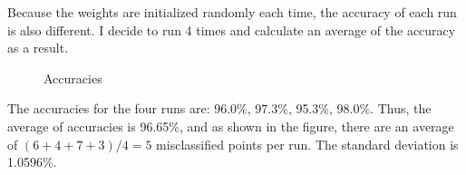 \documentclass{article}
\begin{document}
Because the weights are initialized randomly each time, the accuracy of each run is also different. I decide to run 4 times and calculate an average of the accuracy as a result.
\begin{figure}[htbp]
\centering
{}
\quad
{}
\quad
{}
\quad
{}
\caption{Accuracies}
\end{figure}
\noindent
The accuracies for the four runs are: 96.0\%, 97.3\%, 95.3\%, 98.0\%. Thus, the average of accuracies is 96.65\%, and as shown in the figure, there are an average of $(6+4+7+3) / 4 = 5$ misclassified points per run. The standard deviation is 1.0596\%.
\end{document}
